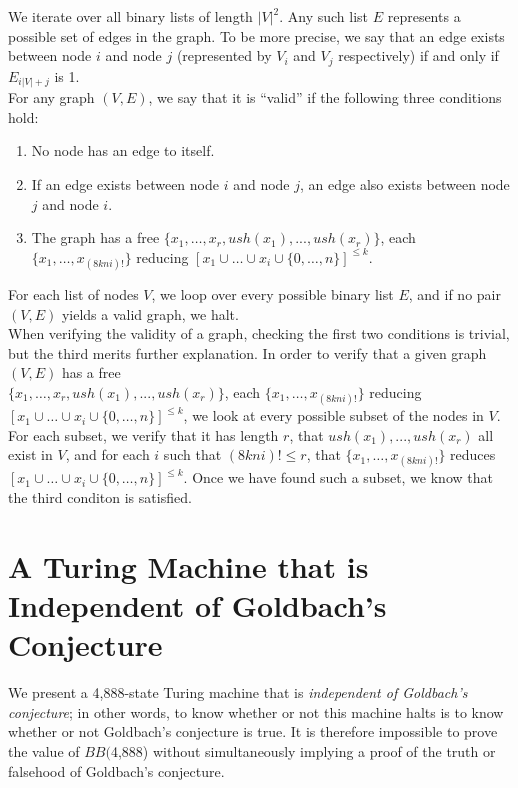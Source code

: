 \documentclass[11pt]{article}
\newcommand{\gbstatenumstate}{4,888-state }
\newcommand{\bbgbstatenum}{$BB($4,888) }
\begin{document}
We iterate over all binary lists of length $|V|^2$. Any such list $E$ represents a possible set of edges in the graph. To be more precise, we say that an edge exists between node $i$ and node $j$ (represented by $V_i$ and $V_j$ respectively) if and only if $E_{i|V| + j}$ is 1. \\

For any graph $(V, E)$, we say that it is ``valid'' if the following three conditions hold:

\begin{enumerate}

\item No node has an edge to itself.
\item If an edge exists between node $i$ and node $j$, an edge also exists between node $j$ and node $i$.
\item The graph has a free $\{x_1,\dots,x_r, ush(x_1),...,ush(x_r)\}$, each  $\{x_1, \dots, x_{(8kni)!}\}$ reducing $[x_1 \cup \dots \cup x_i \cup \{0,\dots,n\}]^{\le k}$.

\end{enumerate}

For each list of nodes $V$, we loop over every possible binary list $E$, and if no pair $(V, E)$ yields a valid graph, we halt. \\

When verifying the validity of a graph, checking the first two conditions is trivial, but the third merits further explanation. In order to verify that a given graph $(V, E)$ has a free \\ $\{x_1,\dots,x_r, ush(x_1),...,ush(x_r)\}$, each  $\{x_1, \dots, x_{(8kni)!}\}$ reducing $[x_1 \cup \dots \cup x_i \cup \{0,\dots,n\}]^{\le k}$, we look at every possible subset of the nodes in $V$. For each subset, we verify that it has length $r$, that $ush(x_1),...,ush(x_r)$ all exist in $V$, and for each $i$ such that $(8kni)! \le r$, that $\{x_1, \dots, x_{(8kni)!}\}$ reduces $[x_1 \cup \dots \cup x_i \cup \{0,\dots,n\}]^{\le k}$. Once we have found such a subset, we know that the third conditon is satisfied.

\section{A Turing Machine that is Independent of Goldbach's Conjecture}

We present a \gbstatenumstate Turing machine that is \emph{independent of Goldbach's conjecture}; in other words, to know whether or not this machine halts is to know whether or not Goldbach's conjecture is true. It is therefore impossible to prove the value of \bbgbstatenum without simultaneously implying a proof of the truth or falsehood of Goldbach's conjecture.
\end{document}

